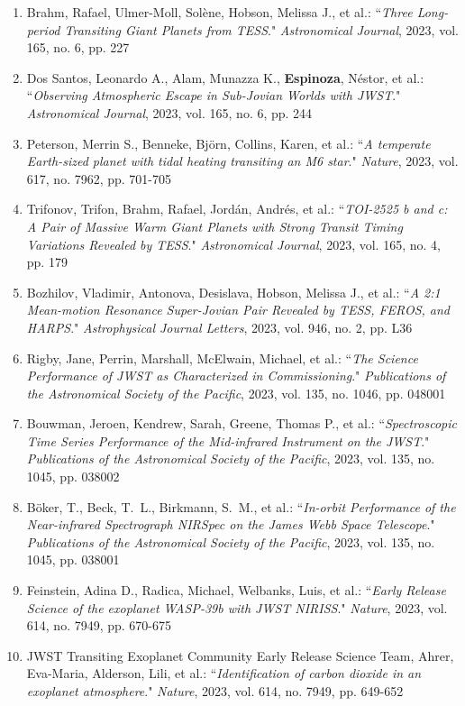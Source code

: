 \documentclass[12pt, a4paper]{article} %
\begin{document}
\begin{flushleft}
\begin{enumerate}
\item Brahm, Rafael, Ulmer-Moll, Solène, Hobson, Melissa J., et al.: ``\textit{Three Long-period Transiting Giant Planets from TESS}." \textit{Astronomical Journal}, 2023, vol. 165, no. 6, pp. 227
\item Dos Santos, Leonardo A., Alam, Munazza K., \textbf{Espinoza}, Néstor, et al.: ``\textit{Observing Atmospheric Escape in Sub-Jovian Worlds with JWST}." \textit{Astronomical Journal}, 2023, vol. 165, no. 6, pp. 244
\item Peterson, Merrin S., Benneke, Björn, Collins, Karen, et al.: ``\textit{A temperate Earth-sized planet with tidal heating transiting an M6 star}." \textit{Nature}, 2023, vol. 617, no. 7962, pp. 701-705
\item Trifonov, Trifon, Brahm, Rafael, Jordán, Andrés, et al.: ``\textit{TOI-2525 b and c: A Pair of Massive Warm Giant Planets with Strong Transit Timing Variations Revealed by TESS}." \textit{Astronomical Journal}, 2023, vol. 165, no. 4, pp. 179
\item Bozhilov, Vladimir, Antonova, Desislava, Hobson, Melissa J., et al.: ``\textit{A 2:1 Mean-motion Resonance Super-Jovian Pair Revealed by TESS, FEROS, and HARPS}." \textit{Astrophysical Journal Letters}, 2023, vol. 946, no. 2, pp. L36
\item Rigby, Jane, Perrin, Marshall, McElwain, Michael, et al.: ``\textit{The Science Performance of JWST as Characterized in Commissioning}." \textit{Publications of the Astronomical Society of the Pacific}, 2023, vol. 135, no. 1046, pp. 048001
\item Bouwman, Jeroen, Kendrew, Sarah, Greene, Thomas P., et al.: ``\textit{Spectroscopic Time Series Performance of the Mid-infrared Instrument on the JWST}." \textit{Publications of the Astronomical Society of the Pacific}, 2023, vol. 135, no. 1045, pp. 038002
\item Böker, T., Beck, T.~L., Birkmann, S.~M., et al.: ``\textit{In-orbit Performance of the Near-infrared Spectrograph NIRSpec on the James Webb Space Telescope}." \textit{Publications of the Astronomical Society of the Pacific}, 2023, vol. 135, no. 1045, pp. 038001
\item Feinstein, Adina D., Radica, Michael, Welbanks, Luis, et al.: ``\textit{Early Release Science of the exoplanet WASP-39b with JWST NIRISS}." \textit{Nature}, 2023, vol. 614, no. 7949, pp. 670-675
\item JWST Transiting Exoplanet Community Early Release Science Team, Ahrer, Eva-Maria, Alderson, Lili, et al.: ``\textit{Identification of carbon dioxide in an exoplanet atmosphere}." \textit{Nature}, 2023, vol. 614, no. 7949, pp. 649-652

\end{enumerate}
\end{flushleft}
\end{document}
